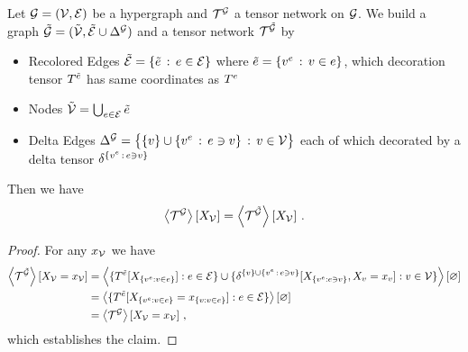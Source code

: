 \begin{lemma}
    \label{lem:deltification}
    Let $\mathcal{G}=(\mathcal{V},\mathcal{E})$ be a hypergraph and $\mathcal{T}^{\mathcal{G}}$ a tensor network on $\mathcal{G}$.
    We build a graph $\tilde{\mathcal{G}}=(\tilde{\mathcal{V}},\tilde{\mathcal{E}}\cup\Delta^{\mathcal{G}})$ and a tensor network $\mathcal{T}^{\tilde{\mathcal{G}}}$ by %
    \begin{itemize}
        \item Recolored Edges $\tilde{\mathcal{E}} = \{\tilde{e} \, : \, e\in \mathcal{E}\}$ where $\tilde{e} = \{v^{e} \, : \, v\in e\}$, which decoration tensor $T^{\tilde{e}}$ has same coordinates as $T^{e}$
        \item Nodes $\tilde{\mathcal{V}} = \bigcup_{e\in\mathcal{E}}\tilde{e}$ %
        \item Delta Edges $\Delta^{\mathcal{G}} =  \big\{ \{v\} \cup \{v^{e} \, : \, e\ni v \} \, : \, v\in\mathcal{V} \big\} $ each of which decorated by a delta tensor $\delta^{\{v^{e} \, : \, e\ni v \}}$
    \end{itemize}
    Then we have
    \begin{align*}
        \left\langle \mathcal{T}^{\mathcal{G}}\right\rangle \left[ X_{\mathcal{V}} \right] =  \left\langle \mathcal{T}^{\tilde{\mathcal{G}}}\right\rangle \left[ X_{\mathcal{V}} \right]  \, .
    \end{align*}
\end{lemma}
\begin{proof}
    For any $x_{\mathcal{V}}$ we have
    \begin{align*}
        \left\langle \mathcal{T}^{\tilde{\mathcal{G}}}\right\rangle \left[ X_{\mathcal{V}}=x_{\mathcal{V}} \right]
        & = \left\langle \{T^{\tilde{e}}[X_{\{v^{e} : v\in e\}}] : e \in \mathcal{E} \}\cup
        \{\delta^{\{v\} \cup \{v^{e} \, : \, e\ni v \}}[X_{\{v^{e} : e\ni v \}}, X_{v}=x_{v} ]  : v\in\mathcal{V} \}
        \right\rangle \left[ \varnothing \right] \\
        & =  \left\langle \{T^{\tilde{e}}[X_{\{v^{e} : v\in e\}} = x_{\{v : v\in e\}} ] : e \in \mathcal{E} \}
        \right\rangle \left[ \varnothing \right] \\
        & = \left\langle \mathcal{T}^{\mathcal{G}}\right\rangle \left[ X_{\mathcal{V}}=x_{\mathcal{V}} \right] \, ,
    \end{align*}
    which establishes the claim.
\end{proof}

